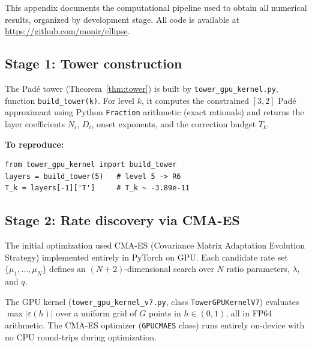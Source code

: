 \documentclass[12pt]{article}
\begin{document}
This appendix documents the computational pipeline used to obtain all numerical results, organized by development stage. All code is available at \url{https://github.com/monir/ellipse}.

\subsection{Stage 1: Tower construction}

The Pad\'e tower (Theorem~\ref{thm:tower}) is built by \texttt{tower\_gpu\_kernel.py}, function \texttt{build\_tower(k)}. For level $k$, it computes the constrained $[3,2]$ Pad\'e approximant using Python \texttt{Fraction} arithmetic (exact rationals) and returns the layer coefficients $N_i$, $D_i$, onset exponents, and the correction budget $T_k$.

\medskip\noindent\textbf{To reproduce:}
\begin{verbatim}
from tower_gpu_kernel import build_tower
layers = build_tower(5)   # level 5 -> R6
T_k = layers[-1]['T']     # T_k ~ -3.89e-11
\end{verbatim}

\subsection{Stage 2: Rate discovery via CMA-ES}

The initial optimization used CMA-ES (Covariance Matrix Adaptation Evolution Strategy) implemented entirely in PyTorch on GPU. Each candidate rate set $\{\mu_1,\ldots,\mu_N\}$ defines an $(N{+}2)$-dimensional search over $N$ ratio parameters, $\lambda$, and $q$.

The GPU kernel (\texttt{tower\_gpu\_kernel\_v7.py}, class \texttt{TowerGPUKernelV7}) evaluates $\max|\varepsilon(h)|$ over a uniform grid of $G$ points in $h \in (0,1)$, all in FP64 arithmetic. The CMA-ES optimizer (\texttt{GPUCMAES} class) runs entirely on-device with no CPU round-trips during optimization.
\end{document}
